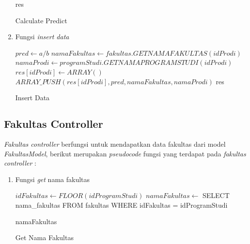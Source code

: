 \begin{enumerate}
\begin{algorithm}[H]
\begin{algorithmic}[1]
                    \State \Return res
                \EndProcedure
            \end{algorithmic} 
            \caption{Calculate Predict}
            \label{alg:calculate Predict1}
        \end{algorithm}
    
    \item Fungsi \textit{insert data} \\

        \begin{algorithm}[H]
            \begin{algorithmic}[1]
                    \State $pred \gets a/b$
                    \State $namaFakultas \gets fakultas.GETNAMAFAKULTAS(idProdi)$
                    \State $namaProdi \gets programStudi.GETNAMAPROGRAMSTUDI(idProdi)$
                    \State $res[idProdi] \gets ARRAY()$
                    \State $ARRAY\_PUSH(res[idProdi], pred, namaFakultas, namaProdi)$
                    \State \Return res
                \EndProcedure
            \end{algorithmic} 
            \caption{Insert Data}
            \label{alg:insertData prediction}
        \end{algorithm}
\end{enumerate}


\subsection{Fakultas Controller}
\label{subsec:fakultas controller}

\textit{Fakultas controller} berfungsi untuk mendapatkan data fakultas dari model \textit{FakultasModel}, berikut merupakan \textit{pseudocode} fungsi yang terdapat pada \textit{fakultas controller} :

\begin{enumerate}
    \item Fungsi \textit{get} nama fakultas \\
    
        \begin{algorithm}[H]
            \begin{algorithmic}[1]
                    \State $idFakultas \gets FLOOR(idProgramStudi)$
                    \State $namaFakultas \gets$ SELECT nama\_fakultas FROM fakultas WHERE idFakultas = idProgramStudi
                    
                    \State \Return namaFakultas
                \EndProcedure
            \end{algorithmic} 
            \caption{Get Nama Fakultas}
            \label{alg:getNamaFakultas}
        \end{algorithm}
\end{enumerate}


